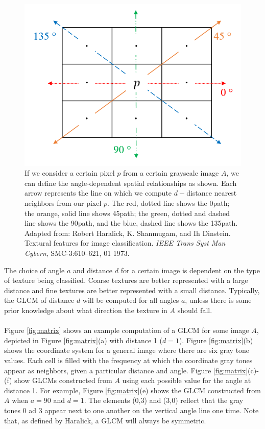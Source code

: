 \documentclass{article}
\begin{document}
    \begin{figure}
      \includegraphics[width=\linewidth]{direction_fig.PNG}
      \caption{If we consider a certain pixel $p$ from a certain grayscale image $A$, we can define the angle-dependent spatial relationships as shown. Each arrow represents the line on which we compute $d-$distance nearest neighbors from our pixel $p$. The red, dotted line shows the 0\textdegree  path; the orange, solid line shows 45\textdegree  path; the green, dotted and dashed line shows the 90\textdegree  path, and the blue, dashed line shows the 135\textdegree  path. Adapted from: Robert Haralick, K. Shanmugam, and Ih Dinstein. Textural features for image classification. \textit{IEEE Trans Syst Man Cybern}, SMC-3:610–621, 01 1973. }
      \label{fig:directions}
    \end{figure}
        The choice of angle $a$ and distance $d$ for a certain image is dependent on the type of texture being classified. Coarse textures are better represented with a large distance and fine textures are better represented with a small distance. Typically, the GLCM of distance $d$ will be computed for all angles $a$, unless there is some prior knowledge about what direction the texture in $A$ should fall. \\ \\
       Figure \ref{fig:matrix} shows an example computation of a GLCM for some image $A$, depicted in Figure \ref{fig:matrix}(a) with distance 1 ($d = 1$). Figure \ref{fig:matrix}(b) shows the coordinate system for a general image where there are six gray tone values. Each cell is filled with the frequency at which the coordinate gray tones appear as neighbors, given a particular distance and angle. Figure \ref{fig:matrix}(c)-(f) show GLCMs constructed from $A$ using each possible value for the angle at distance 1. For example, Figure \ref{fig:matrix}(e) shows the GLCM constructed from $A$ when $a = 90$ and $d = 1$. The elements (0,3) and (3,0) reflect that the gray tones 0 ad 3 appear next to one another on the vertical angle line one time. Note that, as defined by Haralick, a GLCM will always be symmetric. 
\end{document}
